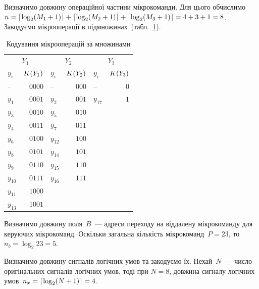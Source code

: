 \documentclass[a4paper,oneside,DIV=12,12pt,headings=normal]{scrartcl}
\newcommand{\ceil}[1]{\mleft\lceil#1\mright\rceil}
\begin{document}
			Визначимо довжину операційної частини мікрокоманди. Для цього обчислимо $
				n = \ceil{\log_2 \mleft(M_1 + 1 \mright)}
				  + \ceil{\log_2 \mleft(M_2 + 1 \mright)}
				  + \ceil{\log_2 \mleft(M_3 + 1 \mright)}
				  = 4 + 3 + 1
				  = 8$.
			Закодуємо мікрооперації в підмножинах~(табл.~\ref{tab:01-00-microop-coding-by-set}).
			\begin{table}[!htbp]
			\centering
				\begin{tabular}{lrlrlr}
					\toprule
						\multicolumn{2}{c}{$Y_1$} & \multicolumn{2}{c}{$Y_2$} & \multicolumn{2}{c}{$Y_3$} \\
						\cmidrule(lr){1-2} \cmidrule(lr){3-4} \cmidrule(lr){5-6}
						$y_i$ & $K\mleft( Y_1 \mright)$ & $y_i$ & $K\mleft( Y_2 \mright)$ & $y_i$ & $K\mleft( Y_3 \mright)$ \\
					\midrule
						     $–$ & $0000$ &      $–$ & $000$ &      $–$ & $0$ \\
						$y_{ 1}$ & $0001$ & $y_{ 2}$ & $001$ & $y_{17}$ & $1$ \\
						$y_{ 3}$ & $0010$ & $y_{ 5}$ & $010$ &          &     \\
						$y_{ 4}$ & $0011$ & $y_{ 7}$ & $011$ &          &     \\
						$y_{ 6}$ & $0100$ & $y_{12}$ & $100$ &          &     \\
						$y_{ 8}$ & $0101$ & $y_{14}$ & $101$ &          &     \\
						$y_{ 9}$ & $0110$ & $y_{15}$ & $110$ &          &     \\
						$y_{10}$ & $0111$ & $y_{16}$ & $111$ &          &     \\
						$y_{11}$ & $1000$ &          &       &          &     \\
						$y_{13}$ & $1001$ &          &       &          &     \\
					\bottomrule
				\end{tabular}
			\caption{Кодування мікрооперацій за множинами}
			\label{tab:01-00-microop-coding-by-set}
			\end{table}
			
			Визначимо довжину поля~$B$~— адреси переходу на віддалену мікрокоманду для керуючих мікрокоманд. Оскільки загальна кількість мікрокоманд~$P = 23$, то $n_b = \log_2{23} = 5$.
			
			Визначимо довжину сигналів логічних умов та закодуємо їх. Нехай~$N$~— число оригінальних сигналів логічних умов, тоді при $N = 8$, довжина сигналу логічних умов~$n_x = \ceil{\log_2 \mleft( N + 1 \mright)} = 4$.
			
\end{document}
